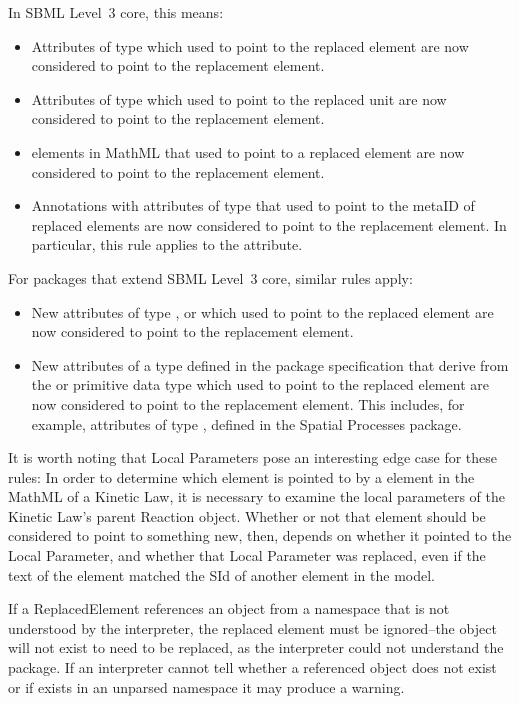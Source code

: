 In SBML Level~3 core, this means: 
\begin{itemize}
\item Attributes of type  which used to point to the replaced element 
 are now considered to point to the replacement element. 
\item Attributes of type  which used to point to the replaced 
 unit are now considered to point to the replacement element. 
\item {} elements in MathML that used to point to a replaced element are 
 now considered to point to the replacement element. 
\item Annotations with attributes of type  that used to point to 
 the metaID of replaced elements are now considered to point to the 
 replacement element. In particular, this rule applies to the 
  attribute.
\end{itemize}

For packages that extend SBML Level~3 core, similar rules apply: 
\begin{itemize}
\item New attributes of type ,  
 or  which used to point 
 to the replaced element are now considered to point to the replacement 
 element.  
\item New attributes of a type defined in the package specification that 
 derive from the  or  primitive data type which used to 
 point to the replaced element are now considered to point to the 
 replacement element. This includes, for example, attributes of type 
 , defined in the Spatial Processes package. 
\end{itemize}

It is worth noting that Local Parameters pose an interesting edge case 
for these rules: In order to determine which element is pointed to by a 
 element in the MathML of a Kinetic Law, it is necessary to examine 
the local parameters of the Kinetic Law's parent Reaction object. 
Whether or not that  element should be considered to point to 
something new, then, depends on whether it pointed to the Local 
Parameter, and whether that Local Parameter was replaced, even if the 
text of the element matched the SId of another element in the model. 

If a ReplacedElement references an object from a namespace that is not
understood by the interpreter, the replaced element must be ignored--the 
object will not exist to need to be replaced, as the interpreter could not
understand the package.  If an interpreter cannot tell whether 
a referenced object does not exist or if exists in an unparsed namespace
it may produce a warning.

